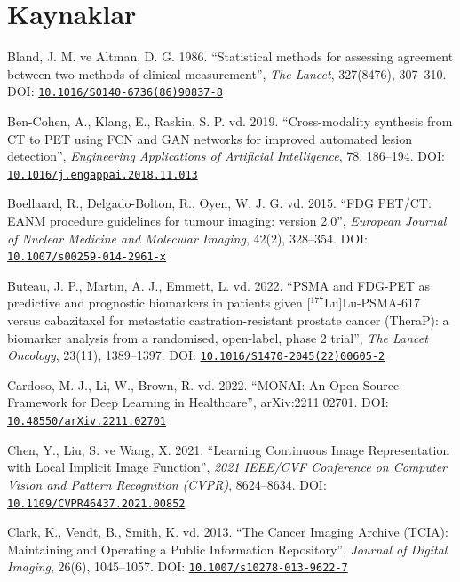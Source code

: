 \documentclass[11pt,a4paper]{article}
\newcommand{\doi}[1]{DOI: \href{https://doi.org/#1}{\nolinkurl{#1}}}
\begin{document}
\section*{Kaynaklar}

\begin{list}{}{\setlength{\leftmargin}{1.5em}\setlength{\itemindent}{-1.5em}%
  \setlength{\itemsep}{0.25\baselineskip}\setlength{\parsep}{0pt}}\small

\item Bland, J. M. ve Altman, D. G. 1986. ``Statistical methods for assessing agreement between two
methods of clinical measurement'', \emph{The Lancet}, 327(8476), 307--310.
\doi{10.1016/S0140-6736(86)90837-8}

\item Ben-Cohen, A., Klang, E., Raskin, S. P. vd. 2019. ``Cross-modality synthesis from CT to PET
using FCN and GAN networks for improved automated lesion detection'', \emph{Engineering
Applications of Artificial Intelligence}, 78, 186--194. \doi{10.1016/j.engappai.2018.11.013}

\item Boellaard, R., Delgado-Bolton, R., Oyen, W. J. G. vd. 2015. ``FDG PET/CT: EANM procedure
guidelines for tumour imaging: version 2.0'', \emph{European Journal of Nuclear Medicine and
Molecular Imaging}, 42(2), 328--354. \doi{10.1007/s00259-014-2961-x}

\item Buteau, J. P., Martin, A. J., Emmett, L. vd. 2022. ``PSMA and FDG-PET as predictive and
prognostic biomarkers in patients given [$^{177}$Lu]Lu-PSMA-617 versus cabazitaxel for metastatic
castration-resistant prostate cancer (TheraP): a biomarker analysis from a randomised, open-label,
phase 2 trial'', \emph{The Lancet Oncology}, 23(11), 1389--1397.
\doi{10.1016/S1470-2045(22)00605-2}

\item Cardoso, M. J., Li, W., Brown, R. vd. 2022. ``MONAI: An Open-Source Framework for Deep
Learning in Healthcare'', arXiv:2211.02701. \doi{10.48550/arXiv.2211.02701}

\item Chen, Y., Liu, S. ve Wang, X. 2021. ``Learning Continuous Image Representation with Local
Implicit Image Function'', \emph{2021 IEEE/CVF Conference on Computer Vision and Pattern
Recognition (CVPR)}, 8624--8634. \doi{10.1109/CVPR46437.2021.00852}

\item Clark, K., Vendt, B., Smith, K. vd. 2013. ``The Cancer Imaging Archive (TCIA): Maintaining
and Operating a Public Information Repository'', \emph{Journal of Digital Imaging}, 26(6),
1045--1057. \doi{10.1007/s10278-013-9622-7}


\end{list}
\end{document}
